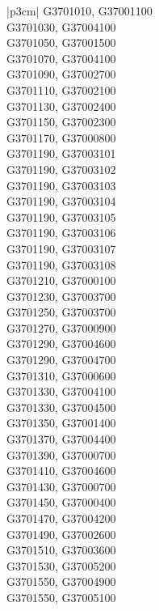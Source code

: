\begin{customLongTable}{ |p{3cm}| }
G3701010, G37001100 \\ \hline
G3701030, G37004100 \\ \hline
G3701050, G37001500 \\ \hline
G3701070, G37004100 \\ \hline
G3701090, G37002700 \\ \hline
G3701110, G37002100 \\ \hline
G3701130, G37002400 \\ \hline
G3701150, G37002300 \\ \hline
G3701170, G37000800 \\ \hline
G3701190, G37003101 \\ \hline
G3701190, G37003102 \\ \hline
G3701190, G37003103 \\ \hline
G3701190, G37003104 \\ \hline
G3701190, G37003105 \\ \hline
G3701190, G37003106 \\ \hline
G3701190, G37003107 \\ \hline
G3701190, G37003108 \\ \hline
G3701210, G37000100 \\ \hline
G3701230, G37003700 \\ \hline
G3701250, G37003700 \\ \hline
G3701270, G37000900 \\ \hline
G3701290, G37004600 \\ \hline
G3701290, G37004700 \\ \hline
G3701310, G37000600 \\ \hline
G3701330, G37004100 \\ \hline
G3701330, G37004500 \\ \hline
G3701350, G37001400 \\ \hline
G3701370, G37004400 \\ \hline
G3701390, G37000700 \\ \hline
G3701410, G37004600 \\ \hline
G3701430, G37000700 \\ \hline
G3701450, G37000400 \\ \hline
G3701470, G37004200 \\ \hline
G3701490, G37002600 \\ \hline
G3701510, G37003600 \\ \hline
G3701530, G37005200 \\ \hline
G3701550, G37004900 \\ \hline
G3701550, G37005100 \\ \hline

\end{customLongTable}
